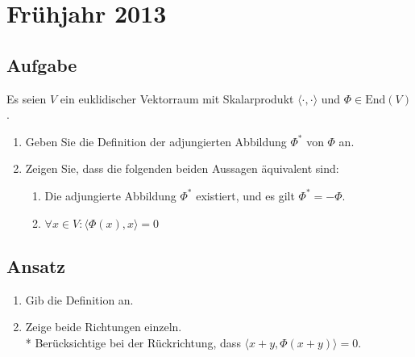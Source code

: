 \newpage

\section{Frühjahr 2013}

\subsection{Aufgabe}
Es seien \( V \) ein euklidischer Vektorraum mit Skalarprodukt \( \langle \cdot, \cdot \rangle \) und \( \Phi \in \text{End}(V) \).
\begin{enumerate}
	\item Geben Sie die Definition der adjungierten Abbildung \( \Phi^\ast \) von \( \Phi \) an.
	\item Zeigen Sie, dass die folgenden beiden Aussagen äquivalent sind:
		\begin{enumerate}
		 	\item Die adjungierte Abbildung \( \Phi^\ast \) existiert, und es gilt \( \Phi^\ast = - \Phi \).
		 	\item \( \forall x \in V : \langle \Phi(x), x \rangle = 0 \) 
		 \end{enumerate} 
\end{enumerate}

\subsection{Ansatz}
\begin{enumerate}
	\item Gib die Definition an.
	\item Zeige beide Richtungen einzeln. \\* Berücksichtige bei der Rückrichtung, dass \( \langle x+y, \Phi(x+y) \rangle = 0 \). 
\end{enumerate}

